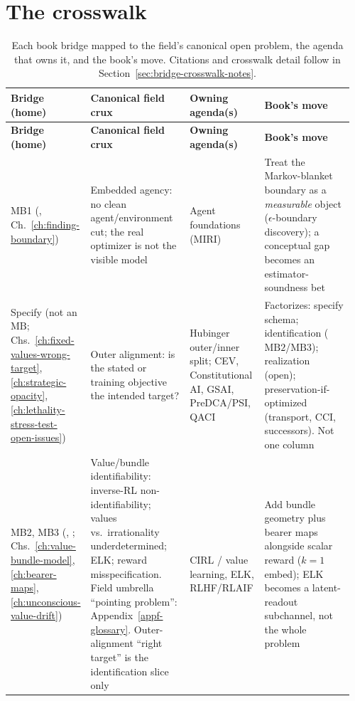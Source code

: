 \section{The crosswalk}
\label{sec:bridge-crosswalk-table}
\begin{landscape}
\renewcommand{\arraystretch}{1.25}
\begin{longtable}{@{}L{0.14\linewidth}L{0.30\linewidth}L{0.22\linewidth}L{0.30\linewidth}@{}}
\caption{Each book bridge mapped to the field's canonical open problem, the agenda that owns it, and the book's move. Citations and crosswalk detail follow in Section~\ref{sec:bridge-crosswalk-notes}.}\label{tab:bridge-crosswalk}\\
\toprule
\textbf{Bridge (home)} & \textbf{Canonical field crux} & \textbf{Owning agenda(s)} & \textbf{Book's move} \\
\midrule
\endfirsthead
\toprule
\textbf{Bridge (home)} & \textbf{Canonical field crux} & \textbf{Owning agenda(s)} & \textbf{Book's move} \\
\midrule
\endhead
\bottomrule
\endfoot
MB1 \newline (, Ch.~\ref{ch:finding-boundary}) & Embedded agency: no clean agent/environment cut; the real optimizer is not the visible model & Agent foundations (MIRI) & Treat the Markov-blanket boundary as a \emph{measurable} object (\(\epsilon\)-boundary discovery); a conceptual gap becomes an estimator-soundness bet \\
Specify \newline (not an \(\text{MB}\); Chs.~\ref{ch:fixed-values-wrong-target}, \ref{ch:strategic-opacity}, \ref{ch:lethality-stress-test-open-issues}) & Outer alignment: is the stated or training objective the intended target? & Hubinger outer/inner split; CEV, Constitutional AI, GSAI, PreDCA/PSI, QACI & Factorizes: specify schema; identification (\(\text{MB2}\)/\(\text{MB3}\)); realization (open); preservation-if-optimized (transport, CCI, successors). Not one column \\
MB2, MB3 \newline (, ; Chs.~\ref{ch:value-bundle-model}, \ref{ch:bearer-maps}, \ref{ch:unconscious-value-drift}) & Value/bundle identifiability: inverse-RL non-identifiability; values vs.\ irrationality underdetermined; ELK; reward misspecification. Field umbrella ``pointing problem'': Appendix~\ref{appf-glossary}. Outer-alignment ``right target'' is the identification slice only & CIRL / value learning, ELK, RLHF/RLAIF & Add bundle geometry plus bearer maps alongside scalar reward (\(k=1\) embed); ELK becomes a latent-readout subchannel, not the whole problem \\

\end{longtable}
\end{landscape}
